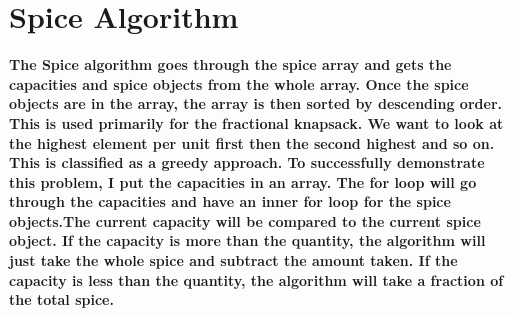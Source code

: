 \documentclass{article}
\begin{document}
\section{Spice Algorithm}
\textbf{ The Spice algorithm goes through the spice array and gets the capacities and spice objects from the whole array. Once the spice objects are in the array, the array is then sorted by descending order. This is used primarily for the fractional knapsack. We want to look at the highest element per unit first then the second highest and so on. This is classified as a greedy approach. To successfully demonstrate this problem, I put the capacities in an array. The for loop will go through the capacities and have an inner for loop for the spice objects.The current capacity will be compared to the current spice object. If the capacity is more than the quantity, the algorithm will just take the whole spice and subtract the amount taken. If the capacity is less than the quantity, the algorithm will take a fraction of the total spice. }
\end{document}
